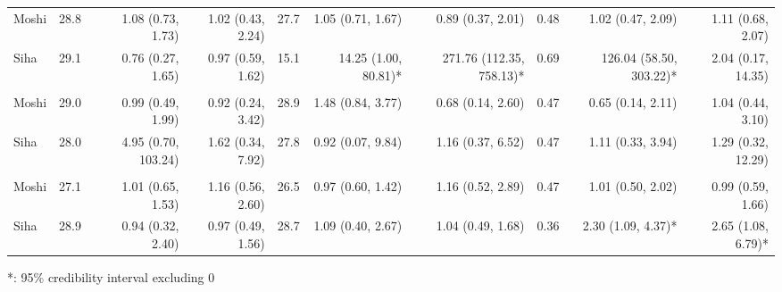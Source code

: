 \begin{table}[t]
\begin{tabular*}{\linewidth}{@{\extracolsep{\fill}}l|rrrrrrrrr}
\midrule\addlinespace[2.5pt]
\multicolumn{10}{l}{Typhoid} \\[2.5pt] 
\midrule\addlinespace[2.5pt]
Moshi & 28.8 & 1.08 (0.73, 1.73)  & 1.02 (0.43, 2.24)  & 27.7 & 1.05 (0.71, 1.67)  & 0.89 (0.37, 2.01)  & 0.48 & 1.02 (0.47, 2.09)  & 1.11 (0.68, 2.07)  \\ 
Siha & 29.1 & 0.76 (0.27, 1.65)  & 0.97 (0.59, 1.62)  & 15.1 & 14.25 (1.00, 80.81)* & 271.76 (112.35, 758.13)* & 0.69 & 126.04 (58.50, 303.22)* & 2.04 (0.17, 14.35)  \\ 
\midrule\addlinespace[2.5pt]
\multicolumn{10}{l}{Leprosy} \\[2.5pt] 
\midrule\addlinespace[2.5pt]
Moshi & 29.0 & 0.99 (0.49, 1.99)  & 0.92 (0.24, 3.42)  & 28.9 & 1.48 (0.84, 3.77)  & 0.68 (0.14, 2.60)  & 0.47 & 0.65 (0.14, 2.11)  & 1.04 (0.44, 3.10)  \\ 
Siha & 28.0 & 4.95 (0.70, 103.24)  & 1.62 (0.34, 7.92)  & 27.8 & 0.92 (0.07, 9.84)  & 1.16 (0.37, 6.52)  & 0.47 & 1.11 (0.33, 3.94)  & 1.29 (0.32, 12.29)  \\ 
\midrule\addlinespace[2.5pt]
\multicolumn{10}{l}{Schistosomiasis} \\[2.5pt] 
\midrule\addlinespace[2.5pt]
Moshi & 27.1 & 1.01 (0.65, 1.53)  & 1.16 (0.56, 2.60)  & 26.5 & 0.97 (0.60, 1.42)  & 1.16 (0.52, 2.89)  & 0.47 & 1.01 (0.50, 2.02)  & 0.99 (0.59, 1.66)  \\ 
Siha & 28.9 & 0.94 (0.32, 2.40)  & 0.97 (0.49, 1.56)  & 28.7 & 1.09 (0.40, 2.67)  & 1.04 (0.49, 1.68)  & 0.36 & 2.30 (1.09, 4.37)* & 2.65 (1.08, 6.79)* \\ 
\bottomrule
\end{tabular*}
\begin{minipage}{\linewidth}
*: 95\% credibility interval excluding 0\\
\end{minipage}
\end{table}

